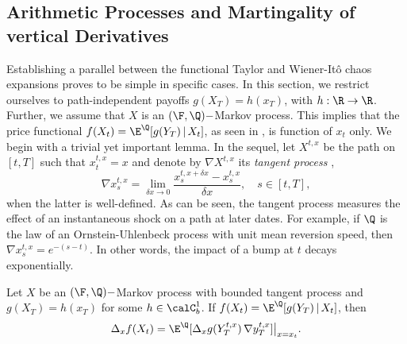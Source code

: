 

\subsection{Arithmetic Processes and Martingality of vertical Derivatives}   \label{sec:SpecialCase} 

Establishing a parallel between the functional Taylor and Wiener-Itô chaos expansions proves to be simple in specific cases. In this section, we restrict ourselves to  %
path-independent  payoffs $g(X_T)=h(x_T)$, with $h: \R \to \R$. Further, we assume that $X$ is an $(\F,\Q)-$Markov process. This implies that the price functional $f(X_t) =\E^{\Q}[g(Y_T)\,|\,X_t]$, as seen in , is function of $x_t$ only. %
We begin with a trivial yet important lemma. In the sequel, let $X^{t,x}$ be the path  on $[t,T]$ such that $x_t^{t,x}=x$ %
and denote by $ \nabla{X}^{t,x}$ its \textit{ tangent process}  \cite[Chapter 5]{IkedaWatanabe}, 
 $$ \nabla {x}_s^{t,x} = \lim_{\delta x \to 0} \frac{x_s^{t,x+\delta x}-x_s^{t,x}}{\delta x}, \quad s \in [t,T],$$%
 when the latter is well-defined. As can be seen, the tangent process measures the effect of an instantaneous shock on a path at later dates. For example, if $\Q$ is the law of an Ornstein-Uhlenbeck process with unit mean reversion speed, %
 then $\nabla{x}_s^{t,x} = e^{-(s-t)}$. In other words, the impact of a bump at  $t$ decays exponentially.
 

\begin{lemma}\label{lem:Tangent}
Let $X$ be an $(\F,\Q)-$Markov process with bounded tangent process and $g(X_T)=h(x_T)$ for some $h\in \calC_b^{1}$. If $f(X_t) = \E^{\Q}[g(Y_T)\,|\,X_t]$, then
  $$\Delta_{x}f(X_t) = \E^{\Q}[\Delta_{x}g(Y^{t,x}_T) \, \nabla y^{t,x}_T %
  ]\big |_{x=x_t}.$$
\end{lemma}

